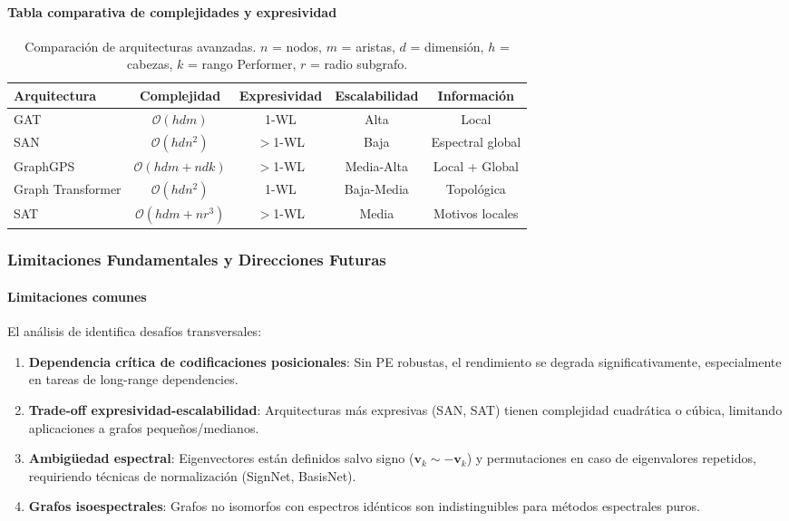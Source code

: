 \paragraph{Tabla comparativa de complejidades y expresividad}

\begin{table}[h]
\centering
\small
\begin{tabular}{|l|c|c|c|c|}
\hline
\textbf{Arquitectura} & \textbf{Complejidad} & \textbf{Expresividad} & \textbf{Escalabilidad} & \textbf{Información} \\
\hline
GAT & $\mathcal{O}(hdm)$ & 1-WL & Alta & Local \\
SAN & $\mathcal{O}(hdn^2)$ & $>$1-WL & Baja & Espectral global \\
GraphGPS & $\mathcal{O}(hdm + ndk)$ & $>$1-WL & Media-Alta & Local + Global \\
Graph Transformer & $\mathcal{O}(hdn^2)$ & 1-WL & Baja-Media & Topológica \\
SAT & $\mathcal{O}(hdm + nr^3)$ & $>$1-WL & Media & Motivos locales \\
\hline
\end{tabular}
\caption[Comparación de arquitecturas avanzadas]{Comparación de arquitecturas avanzadas. $n$ = nodos, $m$ = aristas, $d$ = dimensión, $h$ = cabezas, $k$ = rango Performer, $r$ = radio subgrafo.}
\label{tab:advanced_architectures_comparison}
\end{table}

\subsubsection{Limitaciones Fundamentales y Direcciones Futuras}\label{subsubsec:limitations_future}

\paragraph{Limitaciones comunes}

El análisis de \citet{ying2021transformers} identifica desafíos transversales:

\begin{enumerate}
    \item \textbf{Dependencia crítica de codificaciones posicionales}: Sin PE robustas, el rendimiento se degrada significativamente, especialmente en tareas de long-range dependencies.

    \item \textbf{Trade-off expresividad-escalabilidad}: Arquitecturas más expresivas (SAN, SAT) tienen complejidad cuadrática o cúbica, limitando aplicaciones a grafos pequeños/medianos.

    \item \textbf{Ambigüedad espectral}: Eigenvectores están definidos salvo signo ($\mathbf{v}_k \sim -\mathbf{v}_k$) y permutaciones en caso de eigenvalores repetidos, requiriendo técnicas de normalización (SignNet, BasisNet).

    \item \textbf{Grafos isoespectrales}: Grafos no isomorfos con espectros idénticos son indistinguibles para métodos espectrales puros.
\end{enumerate}

